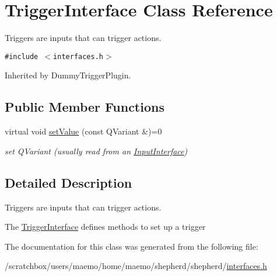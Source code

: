 \hypertarget{class_trigger_interface}{
\section{TriggerInterface Class Reference}
\label{class_trigger_interface}
}
Triggers are inputs that can trigger actions.  


{\tt \#include $<$interfaces.h$>$}

Inherited by DummyTriggerPlugin.

\subsection*{Public Member Functions}
\begin{CompactItemize}
\item 
\hypertarget{class_trigger_interface_a1432ecbae455a0f67e0d01f23a55967}{
virtual void \hyperlink{class_trigger_interface_a1432ecbae455a0f67e0d01f23a55967}{setValue} (const QVariant \&)=0}
\label{class_trigger_interface_a1432ecbae455a0f67e0d01f23a55967}

\begin{CompactList}\small\item\em set QVariant (usually read from an \hyperlink{class_input_interface}{InputInterface}) \item\end{CompactList}\end{CompactItemize}


\subsection{Detailed Description}
Triggers are inputs that can trigger actions. 

The \hyperlink{class_trigger_interface}{TriggerInterface} defines methods to set up a trigger 

The documentation for this class was generated from the following file:\begin{CompactItemize}
\item 
/scratchbox/users/maemo/home/maemo/shepherd/shepherd/\hyperlink{interfaces_8h}{interfaces.h}\end{CompactItemize}
